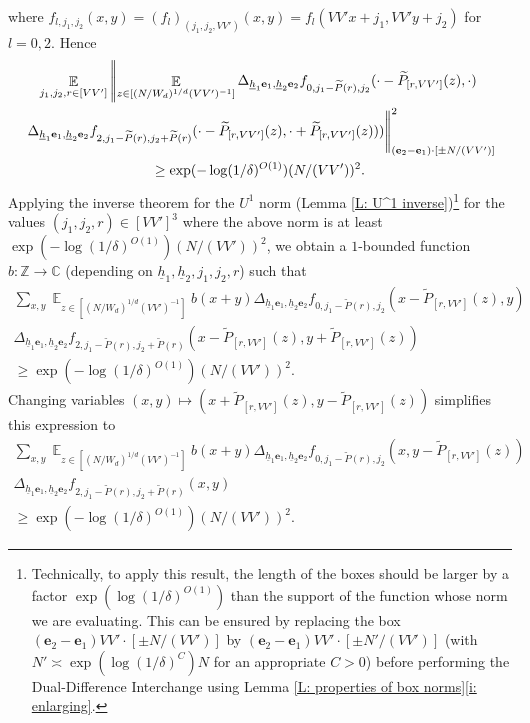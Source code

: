 \documentclass[11pt]{amsart}
\theoremstyle{definition}
\DeclareMathOperator*{\E}{\mathbb{E}}
\newcommand{\be}{{\mathbf{e}}}
\newcommand{\uh}{{\underline{h}}}
\begin{document}
where $f_{l, j_1, j_2}(x,y) = (f_l)_{(j_1, j_2, VV')}(x,y) = f_l(VV'x + j_1, VV'y+j_2)$ for $l=0,2$.
Hence
\begin{multline*}
    \E_{j_1, j_2, r\in[VV']} \left|\!\left|\E_{z \in [(N/W_d)^{1/d}(VV')^{-1}]} \Delta_{\uh_1\be_1,\uh_2 \be_2}f_{0, j_1 - \widetilde P(r), j_2}(\cdot-\widetilde P_{[r,VV']}(z),\cdot)\right.\right.\\
    \left.\left.\Delta_{\uh_1\be_1,\uh_2 \be_2} f_{2, j_1 - \widetilde P(r), j_2 + \widetilde P(r)}(\cdot-\widetilde P_{[r,VV']}(z),\cdot+\widetilde P_{[r,VV']}(z)))\vphantom{\E_{z \in [(N/W_d)^{1/d}(VV')^{-1}]}}\right|\!\right|_{(\be_2-\be_1) \cdot [\pm N/(VV')]}^2\\
    \geq \exp(-\log(1/\delta)^{O(1)}) (N/(VV'))^2.
\end{multline*}
Applying the inverse theorem for the $U^1$ norm (Lemma \ref{L: U^1 inverse})\footnote{Technically, to apply this result, the length of the boxes should be larger by a factor $\exp(\log(1/\delta)^{O(1)})$ than the support of the function whose norm we are evaluating. This can be ensured by replacing the box $(\be_2-\be_1)VV' \cdot [\pm N/(VV')]$ by $(\be_2-\be_1)VV' \cdot [\pm N'/(VV')]$ (with $N' \asymp \exp(\log(1/\delta)^{C})N$ for an appropriate $C>0$) before performing the Dual-Difference Interchange using Lemma \ref{L: properties of box norms}\eqref{i: enlarging}.} for the values $(j_1, j_2, r)\in[VV']^3$ where the above norm is at least $\exp(-\log(1/\delta)^{O(1)}) (N/(VV'))^2$, we obtain a $1$-bounded function $b: \mathbb{Z} \to \mathbb{C}$ (depending on $\uh_1, \uh_2, j_1, j_2, r$) such that
\begin{multline*}
    \sum_{x,y}\E_{z \in [(N/W_d)^{1/d}(VV')^{-1}]} b(x+y) \Delta_{\uh_1 \be_1,\uh_2 \be_2}f_{0, j_1 - \widetilde P(r), j_2}(x-\widetilde P_{[r,VV']}(z),y)\\
    \Delta_{\uh_1 \be_1,\uh_2 \be_2}f_{2, j_1 - \widetilde P(r), j_2 + \widetilde P(r)}(x-\widetilde P_{[r,VV']}(z),y+\widetilde P_{[r,VV']}(z))\\
    \geq \exp(-\log(1/\delta)^{O(1)}) (N/(VV'))^2.
\end{multline*}
Changing variables $(x,y) \mapsto (x+\widetilde P_{[r,VV']}(z), y-\widetilde P_{[r,VV']}(z))$ simplifies this expression to
\begin{multline*}
    \sum_{x,y}\E_{z \in [(N/W_d)^{1/d}(VV')^{-1}]} b(x+y) \Delta_{\uh_1 \be_1,\uh_2 \be_2}f_{0, j_1 - \widetilde P(r), j_2}(x,y-\widetilde P_{[r,VV']}(z))\\
    \Delta_{\uh_1 \be_1,\uh_2 \be_2}f_{2, j_1 - \widetilde P(r), j_2 + \widetilde P(r)}(x,y)\\
    \geq \exp(-\log(1/\delta)^{O(1)}) (N/(VV'))^2.
\end{multline*}
\end{document}
